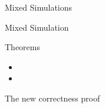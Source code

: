 \begin{frame}{Mixed Simulations}
  \begin{block}{Mixed Simulation}
  \end{block}
  \vfill
  \begin{block}{Theorems}
    \begin{itemize}
    \item {}
    \item {}
    \end{itemize}
  \end{block}
\end{frame}

\begin{frame}{The new correctness proof}
\end{frame}
